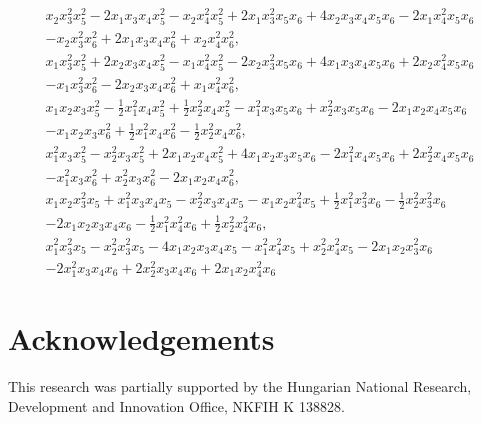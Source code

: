\documentclass[12pt, oneside]{amsart}
\begin{document}
\begin{align*} 
x_{2} x_{3}^{2} x_{5}^{2} - 2 x_{1} x_{3} x_{4} x_{5}^{2} - x_{2} x_{4}^{2} x_{5}^{2} + 2 x_{1} x_{3}^{2} x_{5} x_{6} 
+ 4 x_{2} x_{3} x_{4} x_{5} x_{6} - 2 x_{1} x_{4}^{2} x_{5} x_{6} 
\\ - x_{2} x_{3}^{2} x_{6}^{2} + 2 x_{1} x_{3} x_{4} x_{6}^{2} + x_{2} x_{4}^{2} x_{6}^{2}, 
\\ x_{1} x_{3}^{2} x_{5}^{2} + 2 x_{2} x_{3} x_{4} x_{5}^{2} - x_{1} x_{4}^{2} x_{5}^{2} - 2 x_{2} x_{3}^{2} x_{5} x_{6} + 4 x_{1} x_{3} x_{4} x_{5} x_{6} 
+ 2 x_{2} x_{4}^{2} x_{5} x_{6} 
\\ - x_{1} x_{3}^{2} x_{6}^{2} - 2 x_{2} x_{3} x_{4} x_{6}^{2} + x_{1} x_{4}^{2} x_{6}^{2}, 
\\ x_{1} x_{2} x_{3} x_{5}^{2} - \frac{1}{2} x_{1}^{2} x_{4} x_{5}^{2} + \frac{1}{2} x_{2}^{2} x_{4} x_{5}^{2} - x_{1}^{2} x_{3} x_{5} x_{6} + x_{2}^{2} x_{3} x_{5} x_{6} 
- 2 x_{1} x_{2} x_{4} x_{5} x_{6} 
\\ - x_{1} x_{2} x_{3} x_{6}^{2} + \frac{1}{2} x_{1}^{2} x_{4} x_{6}^{2} - \frac{1}{2} x_{2}^{2} x_{4} x_{6}^{2}, 
\\ x_{1}^{2} x_{3} x_{5}^{2} - x_{2}^{2} x_{3} x_{5}^{2} + 2 x_{1} x_{2} x_{4} x_{5}^{2} + 4 x_{1} x_{2} x_{3} x_{5} x_{6} - 2 x_{1}^{2} x_{4} x_{5} x_{6} 
+ 2 x_{2}^{2} x_{4} x_{5} x_{6} 
\\ - x_{1}^{2} x_{3} x_{6}^{2} + x_{2}^{2} x_{3} x_{6}^{2} - 2 x_{1} x_{2} x_{4} x_{6}^{2}, 
\\ x_{1} x_{2} x_{3}^{2} x_{5} + x_{1}^{2} x_{3} x_{4} x_{5} - x_{2}^{2} x_{3} x_{4} x_{5} - x_{1} x_{2} x_{4}^{2} x_{5} + \frac{1}{2} x_{1}^{2} x_{3}^{2} x_{6} 
- \frac{1}{2} x_{2}^{2} x_{3}^{2} x_{6}
\\ - 2 x_{1} x_{2} x_{3} x_{4} x_{6} - \frac{1}{2} x_{1}^{2} x_{4}^{2} x_{6} + \frac{1}{2} x_{2}^{2} x_{4}^{2} x_{6}, 
\\ x_{1}^{2} x_{3}^{2} x_{5} - x_{2}^{2} x_{3}^{2} x_{5} - 4 x_{1} x_{2} x_{3} x_{4} x_{5} - x_{1}^{2} x_{4}^{2} x_{5} + x_{2}^{2} x_{4}^{2} x_{5} 
- 2 x_{1} x_{2} x_{3}^{2} x_{6} 
\\ - 2 x_{1}^{2} x_{3} x_{4} x_{6} + 2 x_{2}^{2} x_{3} x_{4} x_{6} + 2 x_{1} x_{2} x_{4}^{2} x_{6}
\end{align*} 


\section*{Acknowledgements} 

This research was partially supported by the Hungarian National Research, Development and Innovation Office,  NKFIH K 138828.
\end{document}
